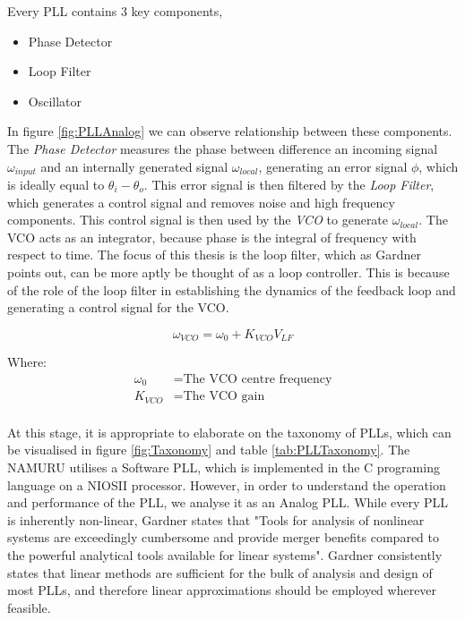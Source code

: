 

Every PLL contains 3 key components,

\begin{itemize}
\item{Phase Detector}
\item{Loop Filter}
\item{Oscillator}
\end{itemize}

In figure \ref{fig:PLLAnalog} we can observe relationship between these components. The \emph{Phase Detector} measures the phase between difference an incoming signal $\omega_{input}$ and an internally generated signal $\omega_{local}$, generating an error signal $\phi$, which is ideally equal to $\theta_i -\theta_o$. This error signal is then filtered by the \emph{Loop Filter}, which generates a control signal and  removes noise and high frequency components. This control signal is then used by the \emph{\ac{VCO}} to generate $\omega_{local}$. The \ac{VCO} acts as an integrator, because phase is the integral of frequency with respect to time. The focus of this thesis is the loop filter, which as Gardner points out, can be more aptly be thought of as a loop controller\cite{Gardner}. This is because of the role of the loop filter in establishing the dynamics of the feedback loop and generating a control signal for the VCO\cite{Kaplan}.

\begin{equation}
	\omega_{VCO} = \omega_0 + K_{VCO}V_{LF}
\end{equation}

Where:
\begin{align*}
	\omega_0 &= \text{The VCO centre frequency}\\
	K_{VCO} &= \text{The VCO gain}\\
\end{align*}




At this stage, it is appropriate to elaborate on the taxonomy of PLLs, which can be visualised in figure \ref{fig:Taxonomy} and table \ref{tab:PLLTaxonomy}. The \ac{NAMURU} utilises a Software PLL, which is implemented in the C programing language on a NIOSII processor. However, in order to understand the operation and performance of the PLL, we analyse it as an Analog PLL. While every PLL is inherently non-linear, Gardner states that "Tools for analysis of nonlinear systems are exceedingly cumbersome and provide merger benefits compared to the powerful analytical tools available for linear systems". Gardner consistently states that linear methods are sufficient for the bulk of analysis and design of most PLLs, and therefore linear approximations should be employed wherever feasible\cite{Gardner}. 

